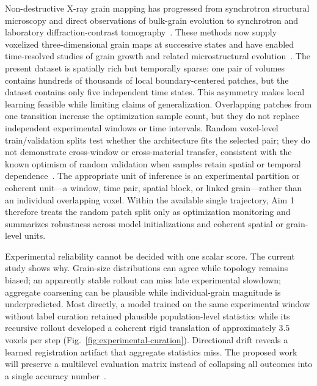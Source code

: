 \documentclass[proposalMode]{ufdissertation}
\begin{document}
Non-destructive X-ray grain mapping has progressed from synchrotron structural microscopy and direct observations of bulk-grain evolution to synchrotron and laboratory diffraction-contrast tomography~\cite{larson2002xray,schmidt2004watching,ludwig2008dct,king2013labdct,mcdonald2015labdct}. These methods now supply voxelized three-dimensional grain maps at successive states and have enabled time-resolved studies of grain growth and related microstructural evolution~\cite{mckenna2014fourD,mcdonald2017sintering,zhang2018grain,wang2025abnormal}. The present dataset is spatially rich but temporally sparse: one pair of volumes contains hundreds of thousands of local boundary-centered patches, but the dataset contains only five independent time states. This asymmetry makes local learning feasible while limiting claims of generalization. Overlapping patches from one transition increase the optimization sample count, but they do not replace independent experimental windows or time intervals. Random voxel-level train/validation splits test whether the architecture fits the selected pair; they do not demonstrate cross-window or cross-material transfer, consistent with the known optimism of random validation when samples retain spatial or temporal dependence~\cite{roberts2017crossvalidation,tian2026experiment}.
The appropriate unit of inference is an experimental partition or coherent unit---a window, time pair, spatial block, or linked grain---rather than an individual overlapping voxel. Within the available single trajectory, Aim 1 therefore treats the random patch split only as optimization monitoring and summarizes robustness across model initializations and coherent spatial or grain-level units.

Experimental reliability cannot be decided with one scalar score. The current study shows why. Grain-size distributions can agree while topology remains biased; an apparently stable rollout can miss late experimental slowdown; aggregate coarsening can be plausible while individual-grain magnitude is underpredicted. Most directly, a model trained on the same experimental window without label curation retained plausible population-level statistics while its recursive rollout developed a coherent rigid translation of approximately \(3.5\) voxels per step (Fig.~\ref{fig:experimental-curation}). Directional drift reveals a learned registration artifact that aggregate statistics miss. The proposed work will preserve a multilevel evaluation matrix instead of collapsing all outcomes into a single accuracy number~\cite{tian2026experiment}.
\end{document}
